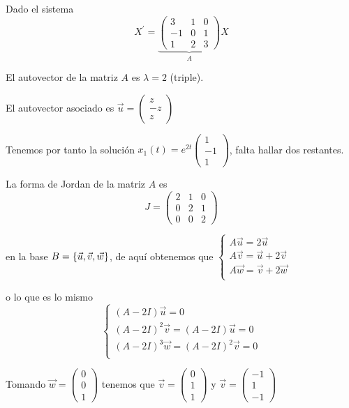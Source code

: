 \begin{example}
Dado el sistema $$X^\prime = \underbrace{\begin{pmatrix}
3 & 1 & 0\\-1 & 0 & 1\\1 & 2 & 3
\end{pmatrix}}_AX$$

El autovector de la matriz $A$ es $\lambda = 2$ (triple). 

El autovector asociado es $\vec{u} = \begin{pmatrix}
z\\-z\\z
\end{pmatrix}$

Tenemos por tanto la solución $x_1(t) = e^{2t}\begin{pmatrix}
1\\ -1\\ 1
\end{pmatrix}$, falta hallar dos restantes.

La forma de Jordan de la matriz $A$ es $$J = \begin{pmatrix}
2& 1& 0\\ 0& 2& 1\\ 0& 0& 2
\end{pmatrix}$$

en la base $B = \{ \vec{u}, \vec{v}, \vec{w} \}$, de aquí obtenemos que $\left\lbrace
  \begin{array}{l}
     A\vec{u} = 2\vec{u}\\
     A\vec{v} = \vec{u} + 2\vec{v}\\
     A\vec{w} = \vec{v} + 2\vec{w}\\
  \end{array}
  \right.
$ 

o lo que es lo mismo $$\left\lbrace
  \begin{array}{l}
     (A-2I)\vec{u} = 0\\
     (A-2I)^2\vec{v} = (A-2I)\vec{u} = 0\\
     (A-2I)^3\vec{w} = (A-2I)^2\vec{v} = 0\\
  \end{array}
  \right.$$
  
Tomando $\vec{w} = \begin{pmatrix}
0\\0\\1
\end{pmatrix}$ tenemos que $\vec{v} = \begin{pmatrix}
0\\1\\1
\end{pmatrix}$ y $\vec{v} = \begin{pmatrix}
-1\\1\\-1
\end{pmatrix}$


\end{example}
